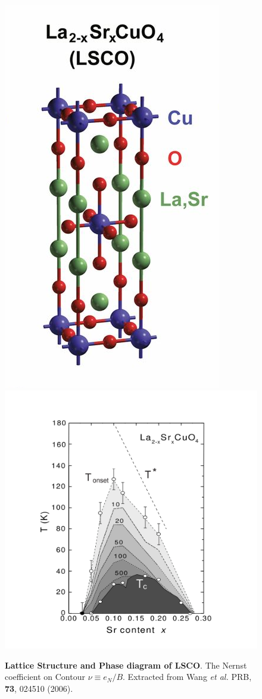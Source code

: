 \documentclass[10pt,aspectratio=43,xcolor=x11names,t]{beamer}%
\begin{document}
\begin{frame}
\begin{columns}
\begin{column}{0.7\textwidth}
\begin{figure}[!htp]
						\includegraphics[scale=1]{SC.png}
						\includegraphics[scale=0.6]{LSCO.png}
						\caption{\textbf{Lattice Structure and Phase diagram of LSCO}. The Nernst coefficient on Contour $\nu\equiv e_N/B$. Extracted from {\scriptsize Wang \textit{et al.} PRB, \textbf{73}, 024510 (2006)}.}
					\end{figure}
				\end{column}
			\end{columns}
		\end{frame}
\end{document}
